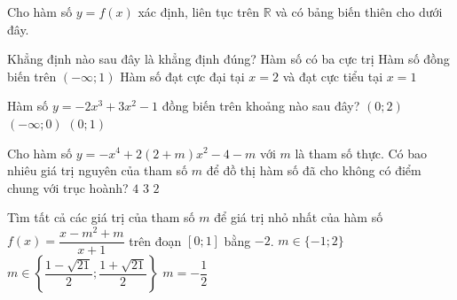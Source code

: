 \begin{ex}%
Cho hàm số $y=f(x)$ xác định, liên tục trên $\mathbb{R}$ và có bảng biến thiên cho dưới đây.
\begin{center}
\end{center}
Khẳng định nào sau đây là khẳng định đúng?
{Hàm số có ba cực trị}
{\True Hàm số đồng biến trên $(-\infty;1)$}
{Hàm số đạt cực đại tại $x=2$ và đạt cực tiểu tại $x=1$}
\end{ex}

\begin{ex}%
Hàm số $y=-2x^3+3x^2-1$ đồng biến trên khoảng nào sau đây?
{$(0;2)$}
{$(-\infty;0)$}
{\True $(0;1)$}
\end{ex}

\begin{ex}%
Cho hàm số $y=-x^4+2(2+m)x^2-4-m$ với $m$ là tham số thực. Có bao nhiêu giá trị nguyên của tham số $m$ để đồ thị hàm số đã cho không có điểm chung với trục hoành?
{$4$}
{\True $3$}
{$2$}
\end{ex}


\begin{ex}%
Tìm tất cả các giá trị của tham số $m$ để giá trị nhỏ nhất của hàm số $f(x)=\dfrac{x-m^2+m}{x+1}$ trên đoạn $[0;1]$ bằng $-2$.
{\True $m\in\{-1;2\}$}
{$m\in\left\{ \dfrac{1-\sqrt{21}}{2}; \dfrac{1+\sqrt{21}}{2}\right\}$}
{$m=-\dfrac{1}{2}$}
\end{ex}


